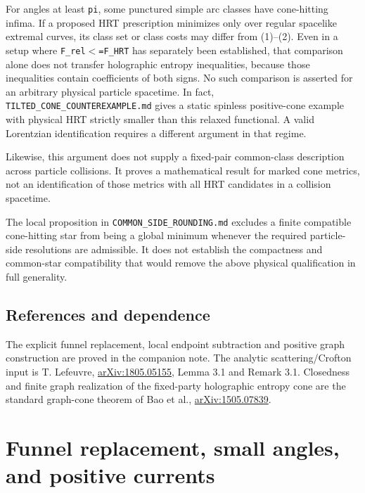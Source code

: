 \documentclass[11pt]{article}
\renewcommand{\textless}{\ensuremath{<}}
\begin{document}
For angles at least \texttt{pi}, some punctured simple arc classes have
cone-hitting infima. If a proposed HRT prescription minimizes only over
regular spacelike extremal curves, its class set or class costs may
differ from (1)--(2). Even in a setup where
\texttt{F\_\allowbreak rel\textless{}=F\_\allowbreak HRT} has separately been established, that
comparison alone does not transfer holographic entropy inequalities,
because those inequalities contain coefficients of both signs. No such
comparison is asserted for an arbitrary physical particle spacetime. In
fact, \texttt{TILTED\_\allowbreak CONE\_\allowbreak COUNTEREXAMPLE.md} gives a static spinless
positive-cone example with physical HRT strictly smaller than this
relaxed functional. A valid Lorentzian identification requires a
different argument in that regime.

Likewise, this argument does not supply a fixed-pair common-class
description across particle collisions. It proves a mathematical result
for marked cone metrics, not an identification of those metrics with all
HRT candidates in a collision spacetime.

The local proposition in \texttt{COMMON\_\allowbreak SIDE\_\allowbreak ROUNDING.md} excludes a
finite compatible cone-hitting star from being a global minimum whenever
the required particle-side resolutions are admissible. It does not
establish the compactness and common-star compatibility that would
remove the above physical qualification in full generality.

\subsection{References and dependence}\label{references-and-dependence}

The explicit funnel replacement, local endpoint subtraction and positive
graph construction are proved in the companion note. The analytic
scattering/Crofton input is T. Lefeuvre,
\href{https://arxiv.org/abs/1805.05155}{arXiv:1805.05155}, Lemma 3.1 and
Remark 3.1. Closedness and finite graph realization of the fixed-party
holographic entropy cone are the standard graph-cone theorem of Bao et
al., \href{https://arxiv.org/abs/1505.07839}{arXiv:1505.07839}.

\clearpage

\section{Funnel replacement, small angles, and positive
currents}\label{funnel-replacement-small-angles-and-positive-currents}
\end{document}
